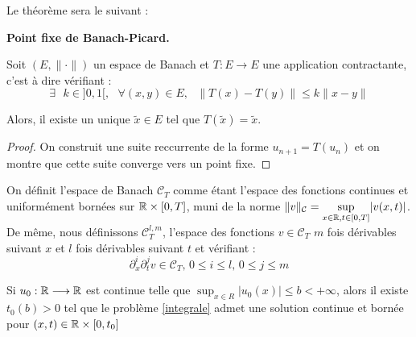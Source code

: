 Le théorème sera le suivant :

\begin{theorembox}
\begin{theorem}
    \textbf{Point fixe de Banach-Picard.}

    Soit $(E,\|\cdot\|)$ un espace de Banach et $T:E \longrightarrow E$ une application contractante, c'est à dire vérifiant :
    $$\exists \text{ } k \in ]0,1[, \text{ } \forall (x,y) \in E, \text{ } \|T(x) - T(y)\| \leq k \|x - y\|$$

    Alors, il existe un unique $\tilde{x} \in E$ tel que $T(\tilde{x}) = \tilde{x}$.


\end{theorem}
\end{theorembox}

\begin{proof}
    On construit une suite reccurrente de la forme $u_{n+1} = T(u_n)$ et on montre que cette suite converge vers un point fixe.

\end{proof}

\vspace{1em}

On définit l'espace de Banach $\mathcal{C}_T$ comme étant l'espace des fonctions continues et uniformément bornées sur $\mathbb{R} \times [0,T]$,
muni de la norme $\|v\|_{\mathcal{C}} = \underset{x \in \mathbb{R}, t \in [0,T]}{\sup}|v(x,t)|$.
De même, nous définissons $\mathcal{C}_T ^{l,m}$, l'espace des fonctions $v \in \mathcal{C}_T$ $m$ fois dérivables suivant $x$ et $l$ fois dérivables suivant $t$ et vérifiant :
$$\partial_x^i \partial_t ^j v \in \mathcal{C}_T \text{, } 0 \leq i \leq l \text{, } 0 \leq j \leq m$$

\begin{lemmabox}
\begin{lemma} \label{lemme 1}
    Si $u_0:\mathbb{R} \longrightarrow \mathbb{R}$ est continue telle que $\sup_{x \in R}|u_0(x)| \leq b < + \infty$,
    alors il existe $t_0(b) > 0$ tel que le problème \ref{integrale} admet une solution continue et bornée pour $(x,t) \in \mathbb{R} \times [0,t_0]$
\end{lemma}
\end{lemmabox}

